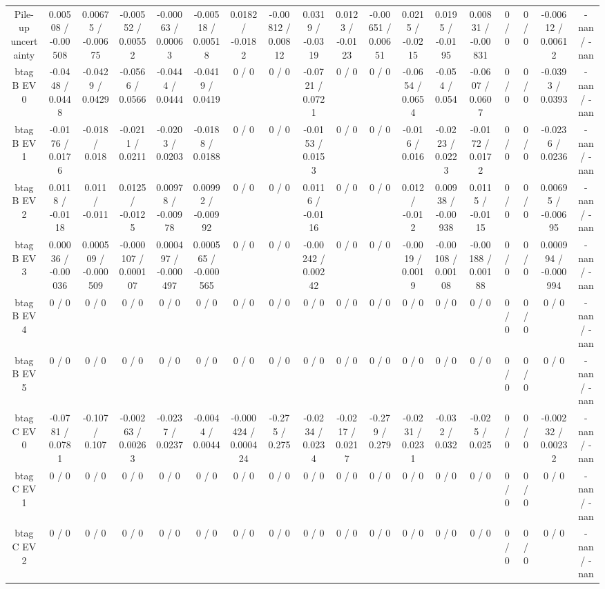 \documentclass[10pt]{article}
\begin{document}
\begin{table}[htbp]
\begin{center}
\begin{tabular}{|c|c|c|c|c|c|c|c|c|c|c|c|c|c|c|c|c|c|}
  Pile-up uncertainty & 0.00508 / -0.00508 & 0.00675 / -0.00675 & -0.00552 / 0.00552 & -0.00063 / 0.00063 & -0.00518 / 0.00518 & 0.0182 / -0.0182 & -0.00812 / 0.00812 & 0.0319 / -0.0319 & 0.0123 / -0.0123 & -0.00651 / 0.00651 & 0.0215 / -0.0215 & 0.0195 / -0.0195 & 0.00831 / -0.00831 & 0 / 0 & 0 / 0 & -0.00612 / 0.00612 & -nan / -nan \\ 
  btag B EV 0 & -0.0448 / 0.0448 & -0.0429 / 0.0429 & -0.0566 / 0.0566 & -0.0444 / 0.0444 & -0.0419 / 0.0419 & 0 / 0 & 0 / 0 & -0.0721 / 0.0721 & 0 / 0 & 0 / 0 & -0.0654 / 0.0654 & -0.054 / 0.054 & -0.0607 / 0.0607 & 0 / 0 & 0 / 0 & -0.0393 / 0.0393 & -nan / -nan \\ 
  btag B EV 1 & -0.0176 / 0.0176 & -0.018 / 0.018 & -0.0211 / 0.0211 & -0.0203 / 0.0203 & -0.0188 / 0.0188 & 0 / 0 & 0 / 0 & -0.0153 / 0.0153 & 0 / 0 & 0 / 0 & -0.016 / 0.016 & -0.0223 / 0.0223 & -0.0172 / 0.0172 & 0 / 0 & 0 / 0 & -0.0236 / 0.0236 & -nan / -nan \\ 
  btag B EV 2 & 0.0118 / -0.0118 & 0.011 / -0.011 & 0.0125 / -0.0125 & 0.00978 / -0.00978 & 0.00992 / -0.00992 & 0 / 0 & 0 / 0 & 0.0116 / -0.0116 & 0 / 0 & 0 / 0 & 0.012 / -0.012 & 0.00938 / -0.00938 & 0.0115 / -0.0115 & 0 / 0 & 0 / 0 & 0.00695 / -0.00695 & -nan / -nan \\ 
  btag B EV 3 & 0.00036 / -0.00036 & 0.000509 / -0.000509 & -0.000107 / 0.000107 & 0.000497 / -0.000497 & 0.000565 / -0.000565 & 0 / 0 & 0 / 0 & -0.00242 / 0.00242 & 0 / 0 & 0 / 0 & -0.0019 / 0.0019 & -0.00108 / 0.00108 & -0.00188 / 0.00188 & 0 / 0 & 0 / 0 & 0.000994 / -0.000994 & -nan / -nan \\ 
  btag B EV 4 & 0 / 0 & 0 / 0 & 0 / 0 & 0 / 0 & 0 / 0 & 0 / 0 & 0 / 0 & 0 / 0 & 0 / 0 & 0 / 0 & 0 / 0 & 0 / 0 & 0 / 0 & 0 / 0 & 0 / 0 & 0 / 0 & -nan / -nan \\ 
  btag B EV 5 & 0 / 0 & 0 / 0 & 0 / 0 & 0 / 0 & 0 / 0 & 0 / 0 & 0 / 0 & 0 / 0 & 0 / 0 & 0 / 0 & 0 / 0 & 0 / 0 & 0 / 0 & 0 / 0 & 0 / 0 & 0 / 0 & -nan / -nan \\ 
  btag C EV 0 & -0.0781 / 0.0781 & -0.107 / 0.107 & -0.00263 / 0.00263 & -0.0237 / 0.0237 & -0.0044 / 0.0044 & -0.000424 / 0.000424 & -0.275 / 0.275 & -0.0234 / 0.0234 & -0.0217 / 0.0217 & -0.279 / 0.279 & -0.0231 / 0.0231 & -0.032 / 0.032 & -0.025 / 0.025 & 0 / 0 & 0 / 0 & -0.00232 / 0.00232 & -nan / -nan \\ 
  btag C EV 1 & 0 / 0 & 0 / 0 & 0 / 0 & 0 / 0 & 0 / 0 & 0 / 0 & 0 / 0 & 0 / 0 & 0 / 0 & 0 / 0 & 0 / 0 & 0 / 0 & 0 / 0 & 0 / 0 & 0 / 0 & 0 / 0 & -nan / -nan \\ 
  btag C EV 2 & 0 / 0 & 0 / 0 & 0 / 0 & 0 / 0 & 0 / 0 & 0 / 0 & 0 / 0 & 0 / 0 & 0 / 0 & 0 / 0 & 0 / 0 & 0 / 0 & 0 / 0 & 0 / 0 & 0 / 0 & 0 / 0 & -nan / -nan \\ 

\end{tabular}
\end{center}
\end{table}
\end{document}
